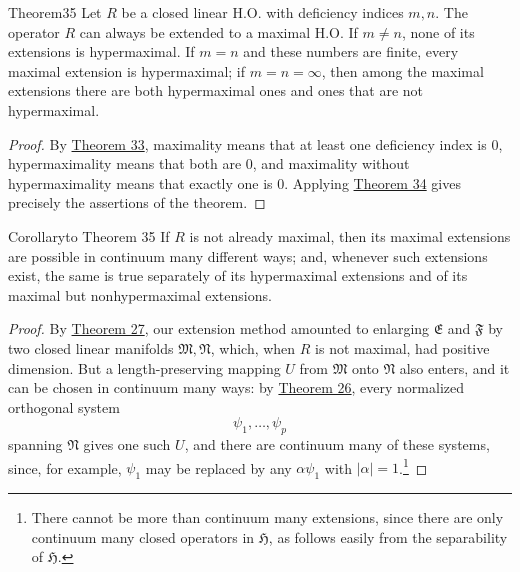﻿\documentclass[paper=b5,fontsize=13pt,bookmarkpackage=false,twoside]{scrartcl}
\newcounter{translatornote}
\begin{document}
\begin{namedstatement}{Theorem}{35}\label{thm:35}
Let $R$ be a closed linear H.O. with deficiency indices $m,n$. The operator $R$ can always be extended to a maximal H.O. If $m\ne n$, none of its extensions is hypermaximal. If $m=n$ and these numbers are finite, every maximal extension is hypermaximal; if $m=n=\infty$, then among the maximal extensions there are both hypermaximal ones and ones that are not hypermaximal.
\end{namedstatement}

\begin{proof}
By \hyperref[thm:33]{Theorem 33}, maximality means that at least one deficiency index is $0$, hypermaximality means that both are $0$, and maximality without hypermaximality means that exactly one is $0$. Applying \hyperref[thm:34]{Theorem 34} gives precisely the assertions of the theorem.
\end{proof}

\begin{namedstatement}{Corollary}{to Theorem 35}\label{cor:35}
If $R$ is not already maximal, then its maximal extensions are possible in continuum many different ways; and, whenever such extensions exist, the same is true separately of its hypermaximal extensions and of its maximal but nonhypermaximal extensions.
\end{namedstatement}

\begin{proof}
By \hyperref[thm:27]{Theorem 27}, our extension method amounted to enlarging $\mathfrak E$ and $\mathfrak F$ by two closed linear manifolds $\mathfrak M,\mathfrak N$, which, when $R$ is not maximal, had positive dimension. But a length-preserving mapping $U$ from $\mathfrak M$ onto $\mathfrak N$ also enters, and it can be chosen in continuum many ways: by \hyperref[thm:26]{Theorem 26}, every normalized orthogonal system
\[
\psi_1,\ldots,\psi_p
\]
spanning $\mathfrak N$ gives one such $U$, and there are continuum many of these systems, since, for example, $\psi_1$ may be replaced by any $\alpha\psi_1$ with $|\alpha|=1$.\footnote{\label{fn:47}There cannot be more than continuum many extensions, since there are only continuum many closed operators in $\mathfrak H$, as follows easily from the separability of $\mathfrak H$.}
\end{proof}
\end{document}
